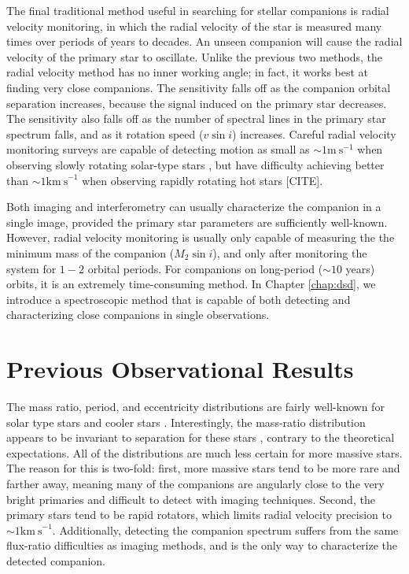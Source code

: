 \documentclass{utthesis}
\begin{document}
The final traditional method useful in searching for stellar companions is radial velocity monitoring, in which the radial velocity of the star is measured many times over periods of years to decades. An unseen companion will cause the radial velocity of the primary star to oscillate. Unlike the previous two methods, the radial velocity method has no inner working angle; in fact, it works best at finding very close companions. The sensitivity falls off as the companion orbital separation increases, because the signal induced on the primary star decreases. The sensitivity also falls off as the number of spectral lines in the primary star spectrum falls, and as it rotation speed ($v\sin{i}$) increases. Careful radial velocity monitoring surveys are capable of detecting motion as small as $\sim 1 \mathrm{m\ s}^{-1}$ when observing slowly rotating solar-type stars \citep[e.g.][]{Wittenmyer2006, Fischer2009, Pepe2011}, but have difficulty achieving better than $\sim 1 \mathrm{km\ s}^{-1}$ when observing rapidly rotating hot stars [CITE].

Both imaging and interferometry can usually characterize the companion in a single image, provided the primary star parameters are sufficiently well-known. However, radial velocity monitoring is usually only capable of measuring the the minimum mass of the companion ($M_2\sin{i}$), and only after monitoring the system for $1-2$ orbital periods. For companions on long-period ($\sim 10$ years) orbits, it is an extremely time-consuming method. In Chapter \ref{chap:dsd}, we introduce a spectroscopic method that is capable of both detecting and characterizing close companions in single observations.


\section{Previous Observational Results}

The mass ratio, period, and eccentricity distributions are fairly well-known for solar type stars \citep{Duquennoy1991, Raghavan2010} and cooler stars \citep{Fischer1992, Delfosse2004}. Interestingly, the mass-ratio distribution appears to be invariant to separation for these stars \citep{Meyer2013}, contrary to the theoretical expectations. All of the distributions are much less certain for more massive stars. The reason for this is two-fold: first, more massive stars tend to be more rare and farther away, meaning many of the companions are angularly close to the very bright primaries and difficult to detect with imaging techniques. Second, the primary stars tend to be rapid rotators, which limits radial velocity precision to $\sim 1 \mathrm{km\ s}^{-1}$. Additionally, detecting the companion spectrum suffers from the same flux-ratio difficulties as imaging methods, and is the only way to characterize the detected companion.
\end{document}
